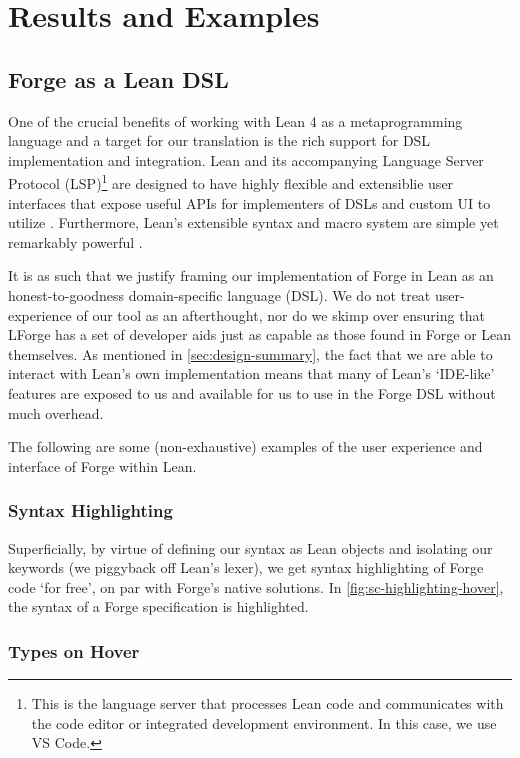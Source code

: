 \section{Results and Examples}

\subsection{Forge as a Lean DSL}\label{sec:dsl}
One of the crucial benefits of working with Lean 4 as a metaprogramming language and a target for our translation is the rich support for DSL implementation and integration. Lean and its accompanying Language Server Protocol (LSP)\footnote{This is the language server that processes Lean code and communicates with the code editor or integrated development environment. In this case, we use VS Code.} are designed to have highly flexible and extensiblie user interfaces that expose useful APIs for implementers of DSLs and custom UI to utilize \cite{moura2021lean, nawrocki2023extensible}. Furthermore, Lean's extensible syntax and macro system are simple yet remarkably powerful \cite{ullrich2022beyond, metaprogramming}. 

It is as such that we justify framing our implementation of Forge in Lean as an honest-to-goodness domain-specific language (DSL). We do not treat user-experience of our tool as an afterthought, nor do we skimp over ensuring that LForge has a set of developer aids just as capable as those found in Forge or Lean themselves. As mentioned in \cref{sec:design-summary}, the fact that we are able to interact with Lean's own implementation means that many of Lean's `IDE-like' features are exposed to us and available for us to use in the Forge DSL without much overhead. 

The following are some (non-exhaustive) examples of the user experience and interface of Forge within Lean. 

\subsubsection{Syntax Highlighting}

Superficially, by virtue of defining our syntax as Lean objects and isolating our keywords (we piggyback off Lean's lexer), we get syntax highlighting of Forge code `for free', on par with Forge's native solutions. In \cref{fig:sc-highlighting-hover}, the syntax of a Forge specification is highlighted. 

\subsubsection{Types on Hover}

